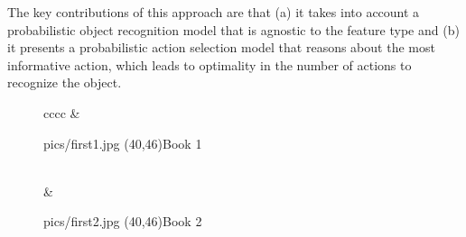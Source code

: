 The key contributions of this approach are that (a) it takes into account a probabilistic object recognition model that is agnostic to the feature type and (b) it presents a probabilistic action selection model that reasons about the most informative action, which leads to optimality in the number of actions to recognize the object.



    \setlength{\tabcolsep}{0.1em}
    \begin{figure}[ht]
    \begin{tabular}{cccc}
     &  {\begin{overpic}[width=0.46\columnwidth]{pics/first1.jpg} 
    \put(40,46){Book 1}
    \end{overpic}}\\
     &   {\begin{overpic}[width=0.46\columnwidth]{pics/first2.jpg} 
    \put(40,46){Book 2}
    \end{overpic}} \\

\end{tabular}
\end{figure}
